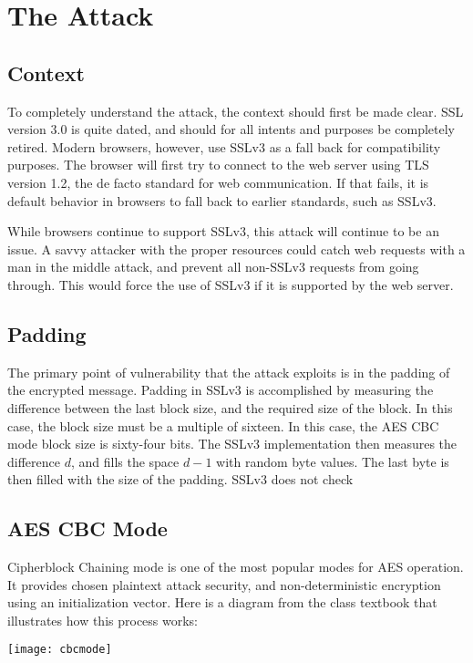 \documentclass[10pt]{article}
\begin{document}
\section*{The Attack}
\subsection*{Context}
To completely understand the attack, the context should first be made clear. 
SSL version 3.0 is quite dated, and should for all intents and purposes be 
completely retired. Modern browsers, however, use SSLv3 as a fall back for
compatibility purposes. The browser will first try to connect to the web server
using TLS version 1.2, the de facto standard for web communication. If that fails,
it is default behavior in browsers to fall back to earlier standards, such as SSLv3.\cite{POODLE}

While browsers continue to support SSLv3, this attack will continue to be an
issue. A savvy attacker with the proper resources could catch web requests with
a man in the middle attack, and prevent all non-SSLv3 requests from going through.
This would force the use of SSLv3 if it is supported by the web server.\cite{MozillaPOODLE} 

\subsection*{Padding}
The primary point of vulnerability that the attack exploits is in the padding
of the encrypted message. Padding in SSLv3 is accomplished by measuring the 
difference between the last block size, and the required size of the block. In
this case, the block size must be a multiple of sixteen. In this case, the AES
CBC mode block size is sixty-four bits. The SSLv3 implementation
then measures the difference $d$, and fills the space $d-1$ with random byte
values. The last byte is then filled with the size of the padding.\cite{SSLv3}
SSLv3 does not check 

\subsection*{AES CBC Mode}
Cipherblock Chaining mode is one of the most popular modes for AES operation.
It provides chosen plaintext attack security, and non-deterministic encryption
using an initialization vector. Here is a diagram from the class textbook that
illustrates how this process works:\cite{rosulek}

\texttt{[image: cbcmode]}
\end{document}
